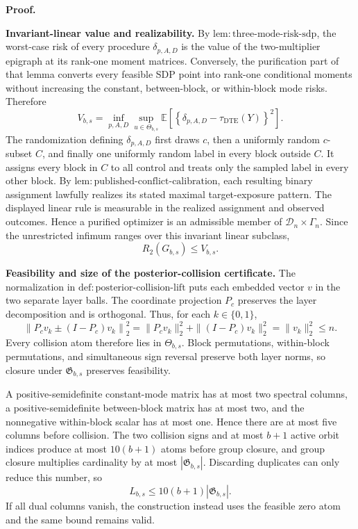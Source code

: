 \textbf{Proof.}

\textbf{Invariant-linear value and realizability.}
By \(\mathrm{lem{:}three\text{-}mode\text{-}risk\text{-}sdp}\), the worst-case risk of every procedure \(\delta_{p,A,D}\) is the value of the two-multiplier epigraph at its rank-one moment matrices. Conversely, the purification part of that lemma converts every feasible SDP point into rank-one conditional moments without increasing the constant, between-block, or within-block mode risks. Therefore
\[
V_{b,s}
=\inf_{p,A,D}\sup_{u\in\Theta_{b,s}}
\mathbb E\!\left[\left\{\delta_{p,A,D}-\tau_{\mathrm{DTE}}(Y)\right\}^2\right].
\tag{1}
\]
The randomization defining \(\delta_{p,A,D}\) first draws \(c\), then a uniformly random \(c\)-subset \(C\), and finally one uniformly random label in every block outside \(C\). It assigns every block in \(C\) to all control and treats only the sampled label in every other block. By \(\mathrm{lem{:}published\text{-}conflict\text{-}calibration}\), each resulting binary assignment lawfully realizes its stated maximal target-exposure pattern. The displayed linear rule is measurable in the realized assignment and observed outcomes. Hence a purified optimizer is an admissible member of \(\mathcal D_n\times\Gamma_n\). Since the unrestricted infimum ranges over this invariant linear subclass,
\[
R_2(G_{b,s})\leq V_{b,s}.
\tag{2}
\]

\textbf{Feasibility and size of the posterior-collision certificate.}
The normalization in \(\mathrm{def{:}posterior\text{-}collision\text{-}lift}\) puts each embedded vector \(v\) in the two separate layer balls. The coordinate projection \(P_c\) preserves the layer decomposition and is orthogonal. Thus, for each \(k\in\{0,1\}\),
\[
\left\|P_cv_k\mathbin{\pm}(I-P_c)v_k\right\|_2^2
=\|P_cv_k\|_2^2+\|(I-P_c)v_k\|_2^2
=\|v_k\|_2^2\leq n.
\tag{3}
\]
Every collision atom therefore lies in \(\Theta_{b,s}\). Block permutations, within-block permutations, and simultaneous sign reversal preserve both layer norms, so closure under \(\mathfrak G_{b,s}\) preserves feasibility.

A positive-semidefinite constant-mode matrix has at most two spectral columns, a positive-semidefinite between-block matrix has at most two, and the nonnegative within-block scalar has at most one. Hence there are at most five columns before collision. The two collision signs and at most \(b+1\) active orbit indices produce at most \(10(b+1)\) atoms before group closure, and group closure multiplies cardinality by at most \(|\mathfrak G_{b,s}|\). Discarding duplicates can only reduce this number, so
\[
L_{b,s}\leq10(b+1)|\mathfrak G_{b,s}|.
\tag{4}
\]
If all dual columns vanish, the construction instead uses the feasible zero atom and the same bound remains valid.

